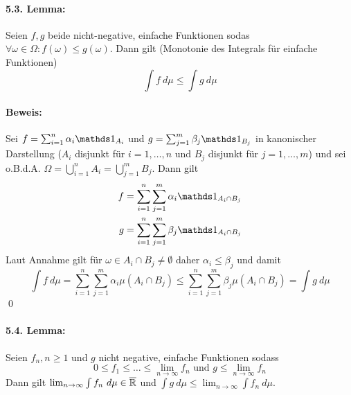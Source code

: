  \paragraph{5.3. Lemma:}Seien $f,g$ beide nicht-negative, einfache Funktionen sodas $\forall\omega\in\Omega:f(\omega)\leq g(\omega)$. Dann gilt (Monotonie des Integrals f\"ur einfache Funktionen)
 $$\int f\ d\mu\leq\int g\ d\mu$$
 
 \paragraph{Beweis:}Sei $f=\sum_{i=1}^n\alpha_i\ind{A_i}$ und $g=\sum_{j=1}^m\beta_j\ind{B_j}$ in kanonischer Darstellung ($A_i$ disjunkt f\"ur $i=1,\hdots,n$ und $B_j$ disjunkt f\"ur $j=1,\hdots,m$) und sei o.B.d.A. $\Omega=\bigcup_{i=1}^nA_i=\bigcup_{j=1}^mB_j$. Dann gilt 
 \begin{align*}
     f&=\sum_{i=1}^n\sum_{j=1}^m\alpha_i\ind{A_i\cap B_j}\\
     g&=\sum_{i=1}^n\sum_{j=1}^m\beta_j\ind{A_i\cap B_j}
 \end{align*}
 Laut Annahme gilt f\"ur $\omega\in A_i\cap B_j\neq\emptyset$ daher $\alpha_i\leq\beta_j$ und damit
 $$\int f\ d\mu=\sum_{i=1}^n\sum_{j=1}^m\alpha_i\mu(A_i\cap B_j)\leq\sum_{i=1}^n\sum_{j=1}^m\beta_j\mu(A_i\cap B_j)=\int g\ d\mu$$
 \qed
 
 \paragraph{5.4. Lemma:}Seien $f_n,n\geq1$ und $g$ nicht negative, einfache Funktionen sodass
 $$0\leq f_1\leq\hdots\leq\lim_{n\to\infty}f_n\text{ und }g\leq\lim_{n\to\infty}f_n$$
 Dann gilt $\lim_{n\to\infty}\int f_n\ d\mu\in\overline\R$ und $\int g \ d\mu\leq\lim_{n\to\infty}\int f_n\ d\mu$.
 
